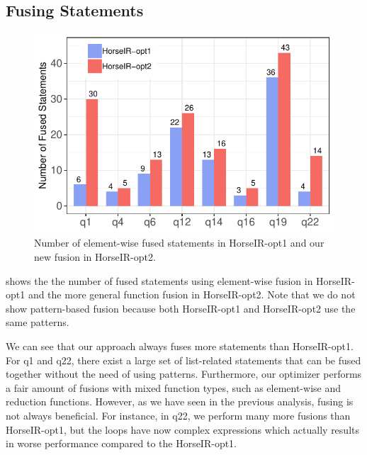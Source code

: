 



\subsection{Fusing Statements}

\begin{figure}[htbp]
\centering
\includegraphics[width=.9\columnwidth]{./src/figure/bar-number.pdf}
\caption{Number of element-wise fused statements in HorseIR-opt1 and our new
fusion in HorseIR-opt2.}
\label{fig:opt_number}
\end{figure}

 shows the the number of fused statements using
element-wise fusion in HorseIR-opt1 and the more general function fusion in
HorseIR-opt2.  Note that we do not show pattern-based fusion because both
HorseIR-opt1 and HorseIR-opt2 use the same patterns. 

We can see that our approach always fuses more statements than HorseIR-opt1.
For q1 and q22, there exist a large set of list-related statements that can be
fused together without the need of using patterns.  Furthermore, our optimizer
performs a fair amount of fusions with mixed function types, such as
element-wise and reduction functions.
However, as we have seen in the previous analysis, fusing is not always
beneficial. For instance, in q22, we perform many more fusions than
HorseIR-opt1, but the loops have now complex expressions which actually results
in worse performance compared to the HorseIR-opt1. 


